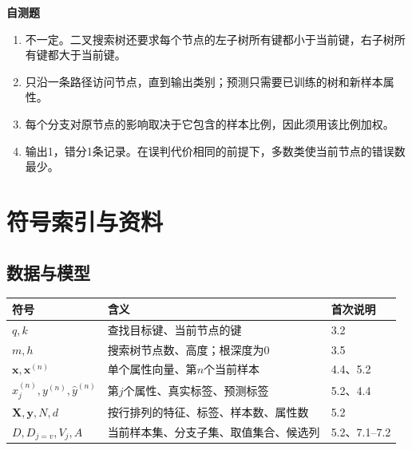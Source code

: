 \documentclass[UTF8,a4paper,11pt,fontset=fandol]{ctexart}
\numberwithin{equation}{subsection}
\begin{document}
\textbf{自测题}
\begin{enumerate}
\item 不一定。二叉搜索树还要求每个节点的左子树所有键都小于当前键，右子树所有键都大于当前键。
\item 只沿一条路径访问节点，直到输出类别；预测只需要已训练的树和新样本属性。
\item 每个分支对原节点的影响取决于它包含的样本比例，因此须用该比例加权。
\item 输出1，错分1条记录。在误判代价相同的前提下，多数类使当前节点的错误数最少。
\end{enumerate}

\clearpage
\section{符号索引与资料}
\subsection{数据与模型}
\par\noindent\begin{tabularx}{\textwidth}{L{3.2cm}Y L{2cm}}
\toprule
符号 & 含义 & 首次说明\\
\midrule
$q,k$ & 查找目标键、当前节点的键 & 3.2\\
$m,h$ & 搜索树节点数、高度；根深度为0 & 3.5\\
$\mathbf x,\mathbf x^{(n)}$ & 单个属性向量、第$n$个当前样本 & 4.4、5.2\\
$x_j^{(n)},y^{(n)},\hat y^{(n)}$ & 第$j$个属性、真实标签、预测标签 & 5.2、4.4\\
$\mathbf X,\mathbf y,N,d$ & 按行排列的特征、标签、样本数、属性数 & 5.2\\
$D,D_{j=v},V_j,A$ & 当前样本集、分支子集、取值集合、候选列 & 5.2、7.1--7.2\\
\bottomrule
\end{tabularx}\par
\end{document}

